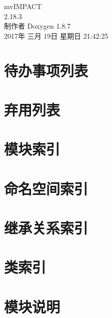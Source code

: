 \documentclass[twoside]{book}
\newcommand{\+}{\discretionary{\mbox{\scriptsize$\hookleftarrow$}}{}{}}
\newcommand{\clearemptydoublepage}{%
  \newpage{\pagestyle{empty}\cleardoublepage}%
}
\begin{document}
\hypersetup{pageanchor=false,
             bookmarks=true,
             bookmarksnumbered=true,
             pdfencoding=unicode
            }
\begin{titlepage}
\vspace*{7cm}
\begin{center}%
{\Large mv\+I\+M\+P\+A\+C\+T \\[1ex]\large 2.\+18.\+3 }\\
\vspace*{1cm}
{\large 制作者 Doxygen 1.8.7}\\
\vspace*{0.5cm}
{\small 2017年 三月 19日 星期日 21:42:25}\\
\end{center}
\end{titlepage}
\clearemptydoublepage
\tableofcontents
\clearemptydoublepage
{}
\hypersetup{pageanchor=true}

\chapter{待办事项列表}
\label{todo}
\hypertarget{todo}{}

\chapter{弃用列表}
\label{deprecated}
\hypertarget{deprecated}{}

\chapter{模块索引}

\chapter{命名空间索引}

\chapter{继承关系索引}

\chapter{类索引}

\chapter{模块说明}




\end{document}

